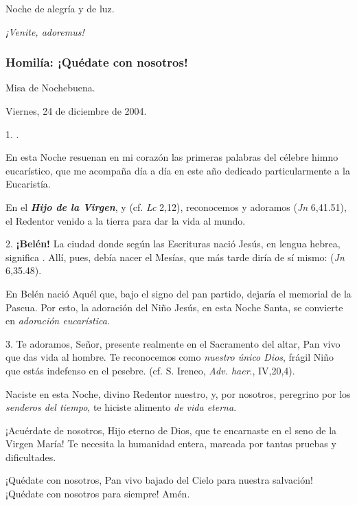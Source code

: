 \begin{body}
\begin{body}
Noche de alegría y de luz.

\emph{¡Venite, adoremus!}

\subsubsection{Homilía: ¡Quédate con nosotros!}

Misa de Nochebuena.

Viernes, 24 de diciembre de 2004.

1. .

En esta Noche resuenan en mi corazón las primeras palabras del célebre himno eucarístico, que me acompaña día a día en este año dedicado particularmente a la Eucaristía.

En el \emph{\textbf{Hijo de la Virgen}},  y  (cf. \emph{Lc} 2,12), reconocemos y adoramos  (\emph{Jn} 6,41.51), el Redentor venido a la tierra para dar la vida al mundo.

2. \textbf{¡Belén!} La ciudad donde según las Escrituras nació Jesús, en lengua hebrea, significa . Allí, pues, debía nacer el Mesías, que más tarde diría de sí mismo:  (\emph{Jn} 6,35.48).

En Belén nació Aquél que, bajo el signo del pan partido, dejaría el memorial de la Pascua. Por esto, la adoración del Niño Jesús, en esta Noche Santa, se convierte en \emph{adoración eucarística}.

3. Te adoramos, Señor, presente realmente en el Sacramento del altar, Pan vivo que das vida al hombre. Te reconocemos como \emph{nuestro único Dios}, frágil Niño que estás indefenso en el pesebre.  (cf. S. Ireneo, \emph{Adv. haer}., IV,20,4).

Naciste en esta Noche, divino Redentor nuestro, y, por nosotros, peregrino por los \emph{senderos del tiempo}, te hiciste alimento \emph{de vida eterna}.

¡Acuérdate de nosotros, Hijo eterno de Dios, que te encarnaste en el seno de la Virgen María! Te necesita la humanidad entera, marcada por tantas pruebas y dificultades.

¡Quédate con nosotros, Pan vivo bajado del Cielo para nuestra salvación! ¡Quédate con nosotros para siempre! Amén.


\end{body}
\end{body}
